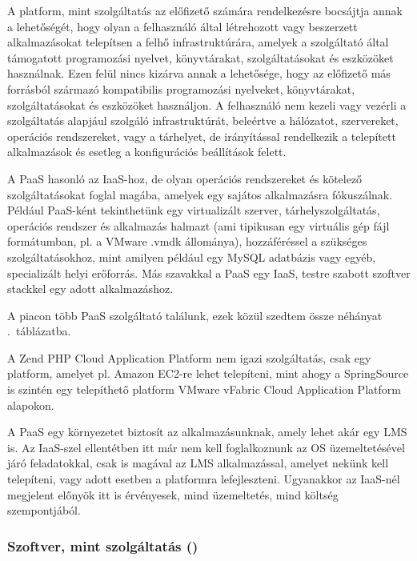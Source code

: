 A platform, mint szolgáltatás az előfizető számára rendelkezésre bocsájtja annak a lehetőségét, hogy olyan a felhasználó által létrehozott vagy beszerzett alkalmazásokat telepítsen a felhő infrastruktúrára, amelyek a szolgáltató által támogatott programozási nyelvet, könyvtárakat, szolgáltatásokat és eszközöket használnak. Ezen felül nincs kizárva  annak a lehetősége, hogy az előfizető más forrásból származó kompatibilis programozási nyelveket, könyvtárakat, szolgáltatásokat és eszközöket használjon. A felhasználó nem kezeli vagy vezérli a szolgáltatás alapjául szolgáló infrastruktúrát, beleértve a hálózatot, szervereket, operációs rendszereket, vagy a tárhelyet, de irányítással rendelkezik a telepített alkalmazások és esetleg a konfigurációs beállítások felett.\cite{nistsp800-145}

A PaaS hasonló az IaaS-hoz, de olyan operációs rendszereket és kötelező szolgáltatásokat foglal magába, amelyek egy sajátos alkalmazásra fókuszálnak. Például PaaS-ként tekinthetünk egy virtualizált szerver, tárhelyszolgáltatás, operációs rendszer és alkalmazás halmazt (ami tipikusan egy virtuális gép fájl formátumban, pl. a VMware .vmdk állománya), hozzáféréssel a szükséges szolgáltatásokhoz, mint amilyen például egy MySQL adatbázis vagy egyéb, specializált helyi erőforrás. Más szavakkal a PaaS egy IaaS, testre szabott szoftver stackkel egy adott alkalmazáshoz.\cite{ccwlinux}

A piacon több PaaS szolgáltató találunk, ezek közül szedtem össze néhányat .~táblázatba.

 

A Zend PHP Cloud Application Platform nem igazi szolgáltatás, csak egy platform, amelyet pl. Amazon EC2-re lehet telepíteni, mint ahogy a SpringSource is szintén egy telepíthető platform VMware vFabric Cloud Application Platform alapokon.

A PaaS egy környezetet biztosít az alkalmazásunknak, amely lehet akár egy LMS is. Az IaaS-szel ellentétben itt már nem kell foglalkoznunk az OS üzemeltetésével járó feladatokkal, csak is magával az LMS alkalmazással, amelyet nekünk kell telepíteni, vagy adott esetben a platformra lefejleszteni. Ugyanakkor az IaaS-nél megjelent előnyök itt is érvényesek, mind üzemeltetés, mind költség szempontjából.


\subsubsection{Szoftver, mint szolgáltatás ()}

